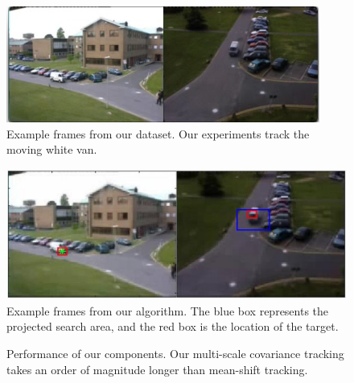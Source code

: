 \documentclass{article}
\begin{document}
\begin{figure}[t]
\centering
\includegraphics[width=\textwidth]{dataset.png}
\caption{Example frames from our dataset. Our experiments track the moving white van.}\label{fig:dataset}
\end{figure}

\begin{figure}[t]
\centering
\includegraphics[width=\textwidth]{results.png}
\caption{Example frames from our algorithm. The blue box represents the projected search area, and the red box is the location of the target.}\label{fig:results}
\end{figure}

\begin{figure}[t]
\centering
{}
\caption{Performance of our components. Our multi-scale covariance tracking takes an order of magnitude longer than mean-shift tracking.}\label{fig:perf}
\end{figure}
\end{document}
